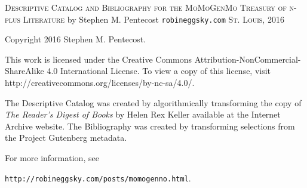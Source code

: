 \documentclass{book}
\begin{document}
{\fontsize{10pt}{12pt}\selectfont
\newpage
\null

\newpage
\begin{center}
\vspace*{5mm}
{\Huge
\textsc{Descriptive Catalog}
\linebreak
\linebreak
\textsc{and}
\linebreak
\linebreak
\textsc{Bibliography}
\linebreak
\linebreak
\textsc{for the}
\linebreak
\linebreak
\textsc{MoMoGenMo Treasury}
\linebreak
\linebreak
\textsc{of}
\linebreak
\linebreak
\textsc{n-plus Literature}
\linebreak
\linebreak
}
{\Large
\linebreak
\linebreak
\linebreak
\linebreak
\linebreak
\linebreak
by
\linebreak
\linebreak
\linebreak
}
{\huge
Stephen M. Pentecost
}
\linebreak
\linebreak
\linebreak
\linebreak
\linebreak
\linebreak
\linebreak
\linebreak
\linebreak
{\LARGE 
\texttt{robineggsky.com}
}
\linebreak
\linebreak
{\Large 
\textsc{St. Louis, 2016}
}
\end{center}

\newpage
\vspace*{1.0in}
Copyright 2016 Stephen M. Pentecost.
\bigbreak
\bigbreak
\bigbreak
\par
This work is licensed under the Creative Commons Attribution-NonCommercial-ShareAlike 4.0 International License. To view a copy of this license, visit http://creativecommons.org/licenses/by-nc-sa/4.0/.
\bigbreak
\par
The Descriptive Catalog was created by algorithmically transforming the copy of \textit{The Reader's Digest of Books} by Helen Rex Keller available at the Internet Archive website.  The Bibliography was created by transforming selections from the Project Gutenberg metadata.
\bigbreak
\par
For more information, see
\par
\vspace*{0.10in}
\texttt{http://robineggsky.com/posts/momogenno.html}.
\par

}
\end{document}
